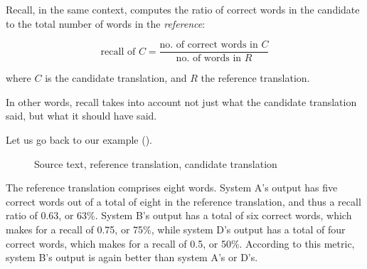\documentclass[output=paper]{langscibook}
\begin{document}
Recall, in the same context, computes the ratio of correct words in the candidate to the total number of words in the \textit{reference}:

\begin{equation}
\text{recall of }C=\frac{\text{no. of correct words in } C}{\text{no. of words in } R}
\end{equation}

\noindent where $C$ is the candidate translation, and $R$ the reference translation.

In other words, recall takes into account not just what the candidate translation said, but what it should have said.

Let us go back to our example ().\largerpage

\begin{figure}
\small
{}
\caption{\label{bkm:Ref69668094}\label{fig:rossi:7a} Source text, reference translation, candidate translation}
\end{figure}

The reference translation comprises eight words. System A’s output has five correct words out of a total of eight in the reference translation, and thus a recall ratio of 0.63, or 63\%. System B’s output has a total of six correct words, which makes for a recall of 0.75, or 75\%, while system D’s output has a total of four correct words, which makes for a recall of 0.5, or 50\%. According to this metric, system B’s output is again better than system A’s or D’s.

\end{document}
